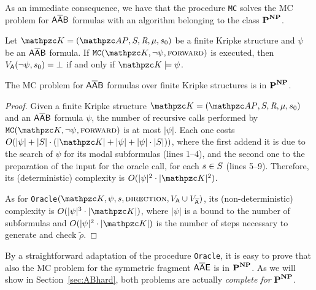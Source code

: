 As an immediate consequence, we have that the procedure  \texttt{MC} solves the MC problem for $\mathsf{A\overline{A}B}$ formulas with an  algorithm belonging to the class $\textbf{P}^{\textbf{NP}}$.

\begin{corollary}
Let $\Ku=\KuDef$ be a finite Kripke structure and $\psi$ be an $\mathsf{A\overline{A}B}$ formula. If $\texttt{MC}(\Ku,\neg\psi,\textsc{forward})$ is executed, then $V_{\mathsf{A}}(\neg\psi,s_0)=\bot$ if and only if $\Ku\models \psi$.
\end{corollary}

\begin{corollary}\label{coro:AAbarBalgo}
The MC problem for $\mathsf{A\overline{A}B}$ formulas over finite Kripke structures is in $\textbf{P}^{\textbf{NP}}$.
\end{corollary}
\begin{proof}
Given a finite Kripke structure $\Ku=\KuDef$ and an $\mathsf{A\overline{A}B}$ formula $\psi$, the number of recursive calls performed by $\texttt{MC}(\Ku,\neg\psi,\textsc{forward})$ is at most $|\psi|$. Each one costs $O(|\psi|+|\States|\cdot (|\Ku|+|\psi|+|\psi|\cdot |\States|))$, where the first addend it is due to the search of $\psi$ for its modal subformulas (lines 1--4), and the second one to the preparation of the input for the oracle call, for each $s\in S$ (lines 5--9). Therefore, its (deterministic) complexity is $O(|\psi|^2\cdot |\Ku|^2)$.

As for \texttt{Oracle}$(\Ku,\psi,s,\textsc{direction},V_{\A}\cup V_{\Abar})$, its (non-deterministic) complexity is $O(|\psi|^3\cdot |\Ku|)$, where $|\psi|$ is a bound to the number of subformulas and $O(|\psi|^2 \cdot |\Ku|)$ is the number of steps necessary to generate and check $\tilde{\rho}$.
\end{proof}

By a straightforward adaptation of the procedure \texttt{Oracle}, it is easy to prove that also the MC problem for the symmetric fragment $\mathsf{A\overline{A}E}$ is in $\textbf{P}^{\textbf{NP}}$.
%
As we will show in Section~\ref{sec:ABhard}, both problems are actually \emph{complete for} $\textbf{P}^{\textbf{NP}}$.